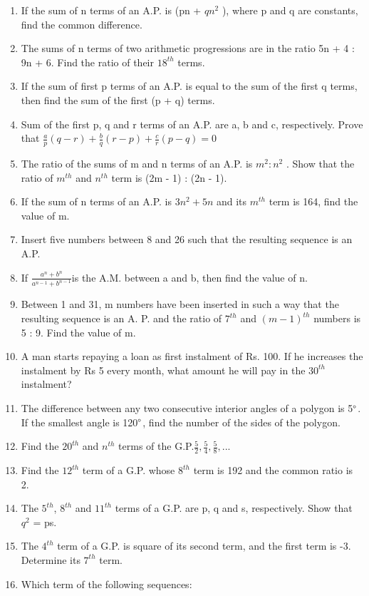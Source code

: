 \begin{enumerate}[label=\arabic*.,ref=\thesubsection.\theenumi]
\item If the sum of n terms of an A.P. is (pn + $qn^2$ ), where p and q are constants, find the common difference.
\item The sums of n terms of two arithmetic progressions are in the ratio 5n + 4 : 9n + 6. Find the ratio of their $18^{th}$ terms.
\item If the sum of first p terms of an A.P. is equal to the sum of the first q terms, then find the sum of the first (p + q) terms.
\item Sum of the first p, q and r terms of an A.P. are a, b and c, respectively. Prove that
 $\frac{a}{p}(q-r)+\frac{b}{q}(r-p)+\frac{c}{r}(p-q) = 0$
\item The ratio of the sums of m and n terms of an A.P. is $m^2 : n^2$ . Show that the ratio of 
$m^{th}$ and $n^{th}$ term is (2m - 1) : (2n - 1).
\item If the sum of n terms of an A.P. is $3n^2 + 5n$ and its $m^{th}$ term is 164, find the value
of m.
\item Insert five numbers between 8 and 26 such that the resulting sequence is an A.P.
\item If $\frac{a^n+b^n}{a^{n-1}+b^{n-1}}$is the A.M. between a and b, then find the value of n.
\item Between 1 and 31, m numbers have been inserted in such a way that the resulting sequence is an A. P. and the ratio of $7^{th}$ and $(m - 1)^{th}$ numbers is 5 : 9. Find the value of m.
\item A man starts repaying a loan as first instalment of Rs. 100. If he increases the
instalment by Rs 5 every month, what amount he will pay in the $30^{th}$ instalment?
\item The difference between any two consecutive interior angles of a polygon is 5$\degree$. If the smallest angle is 120$\degree$, find the number of the sides of the polygon. 
\item Find the $20^{th}$ and $n^{th}$ terms of the G.P.$\frac{5}{2}, \frac{5}{4}, \frac{5}{8},...$
\item Find the $12^{th}$ term of a G.P. whose $8^{th}$ term is 192 and the common ratio is 2.
\item The $5^{th}$, $8^{th}$ and $11^{th}$ terms of a G.P. are p, q and s, respectively. Show that 
$q^2$ = ps.
\item The $4^{th}$ term of a G.P. is square of its second term, and the first term is -3. Determine its $7^{th}$ term.
\item Which term of the following sequences:\\

\end{enumerate}
